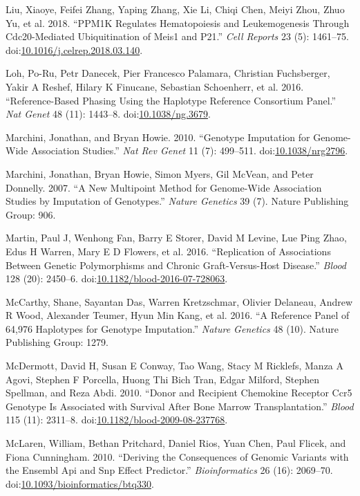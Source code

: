\documentclass[]{DissertateOSU}
\begin{document}
\hypertarget{ref-Liu_2018}{}
Liu, Xiaoye, Feifei Zhang, Yaping Zhang, Xie Li, Chiqi Chen, Meiyi Zhou,
Zhuo Yu, et al. 2018. ``PPM1K Regulates Hematopoiesis and Leukemogenesis
Through Cdc20-Mediated Ubiquitination of Meis1 and P21.'' \emph{Cell
Reports} 23 (5): 1461--75.
doi:\href{https://doi.org/10.1016/j.celrep.2018.03.140}{10.1016/j.celrep.2018.03.140}.

\hypertarget{ref-eagle2}{}
Loh, Po-Ru, Petr Danecek, Pier Francesco Palamara, Christian
Fuchsberger, Yakir A Reshef, Hilary K Finucane, Sebastian Schoenherr, et
al. 2016. ``Reference-Based Phasing Using the Haplotype Reference
Consortium Panel.'' \emph{Nat Genet} 48 (11): 1443--8.
doi:\href{https://doi.org/10.1038/ng.3679}{10.1038/ng.3679}.

\hypertarget{ref-marchini_impute}{}
Marchini, Jonathan, and Bryan Howie. 2010. ``Genotype Imputation for
Genome-Wide Association Studies.'' \emph{Nat Rev Genet} 11 (7):
499--511. doi:\href{https://doi.org/10.1038/nrg2796}{10.1038/nrg2796}.

\hypertarget{ref-snptest}{}
Marchini, Jonathan, Bryan Howie, Simon Myers, Gil McVean, and Peter
Donnelly. 2007. ``A New Multipoint Method for Genome-Wide Association
Studies by Imputation of Genotypes.'' \emph{Nature Genetics} 39 (7).
Nature Publishing Group: 906.

\hypertarget{ref-martin_2016}{}
Martin, Paul J, Wenhong Fan, Barry E Storer, David M Levine, Lue Ping
Zhao, Edus H Warren, Mary E D Flowers, et al. 2016. ``Replication of
Associations Between Genetic Polymorphisms and Chronic Graft-Versus-Host
Disease.'' \emph{Blood} 128 (20): 2450--6.
doi:\href{https://doi.org/10.1182/blood-2016-07-728063}{10.1182/blood-2016-07-728063}.

\hypertarget{ref-hrc}{}
McCarthy, Shane, Sayantan Das, Warren Kretzschmar, Olivier Delaneau,
Andrew R Wood, Alexander Teumer, Hyun Min Kang, et al. 2016. ``A
Reference Panel of 64,976 Haplotypes for Genotype Imputation.''
\emph{Nature Genetics} 48 (10). Nature Publishing Group: 1279.

\hypertarget{ref-mcdermott2010}{}
McDermott, David H, Susan E Conway, Tao Wang, Stacy M Ricklefs, Manza A
Agovi, Stephen F Porcella, Huong Thi Bich Tran, Edgar Milford, Stephen
Spellman, and Reza Abdi. 2010. ``Donor and Recipient Chemokine Receptor
Ccr5 Genotype Is Associated with Survival After Bone Marrow
Transplantation.'' \emph{Blood} 115 (11): 2311--8.
doi:\href{https://doi.org/10.1182/blood-2009-08-237768}{10.1182/blood-2009-08-237768}.

\hypertarget{ref-vep_2010}{}
McLaren, William, Bethan Pritchard, Daniel Rios, Yuan Chen, Paul Flicek,
and Fiona Cunningham. 2010. ``Deriving the Consequences of Genomic
Variants with the Ensembl Api and Snp Effect Predictor.''
\emph{Bioinformatics} 26 (16): 2069--70.
doi:\href{https://doi.org/10.1093/bioinformatics/btq330}{10.1093/bioinformatics/btq330}.
\end{document}
